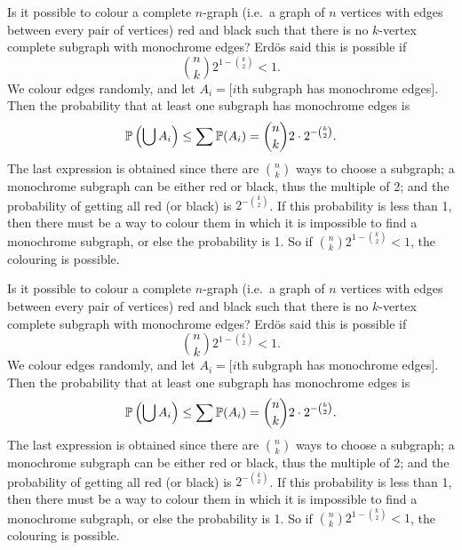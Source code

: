 \begin{note}
  \begin{field}
    \begin{eg}[Erd\"os 1947]
      Is it possible to colour a complete $n$-graph (i.e.\ a graph of $n$ vertices with edges between every pair of vertices) red and black such that there is no $k$-vertex complete subgraph with monochrome edges?
      Erd\"os said this is possible if
      \[
        \binom{n}{k} 2^{1 - \binom{k}{2}} < 1.
      \]
      We colour edges randomly, and let $A_i=[i$th subgraph has monochrome edges$]$. Then the probability that at least one subgraph has monochrome edges is
      \[
        \P\left(\bigcup A_i\right) \leq \sum \P(A_i) = \binom{n}{k} 2\cdot 2^{-\binom{k}{2}}.
      \]
      The last expression is obtained since there are $\binom{n}{k}$ ways to choose a subgraph; a monochrome subgraph can be either red or black, thus the multiple of 2; and the probability of getting all red (or black) is $2^{-\binom{k}{2}}$.
      If this probability is less than 1, then there must be a way to colour them in which it is impossible to find a monochrome subgraph, or else the probability is 1. So if $\binom{n}{k} 2^{1 - \binom{k}{2}} < 1$, the colouring is possible.
    \end{eg}
  \end{field}
  \begin{field}
    \begin{eg}[Erd\"os 1947]
      Is it possible to colour a complete $n$-graph (i.e.\ a graph of $n$ vertices with edges between every pair of vertices) red and black such that there is no $k$-vertex complete subgraph with monochrome edges?
      Erd\"os said this is possible if
      \[
        \binom{n}{k} 2^{1 - \binom{k}{2}} < 1.
      \]
      We colour edges randomly, and let $A_i=[i$th subgraph has monochrome edges$]$. Then the probability that at least one subgraph has monochrome edges is
      \[
        \P\left(\bigcup A_i\right) \leq \sum \P(A_i) = \binom{n}{k} 2\cdot 2^{-\binom{k}{2}}.
      \]
      The last expression is obtained since there are $\binom{n}{k}$ ways to choose a subgraph; a monochrome subgraph can be either red or black, thus the multiple of 2; and the probability of getting all red (or black) is $2^{-\binom{k}{2}}$.
      If this probability is less than 1, then there must be a way to colour them in which it is impossible to find a monochrome subgraph, or else the probability is 1. So if $\binom{n}{k} 2^{1 - \binom{k}{2}} < 1$, the colouring is possible.
    \end{eg}
  \end{field}
  \xplain{}%
\end{note}

